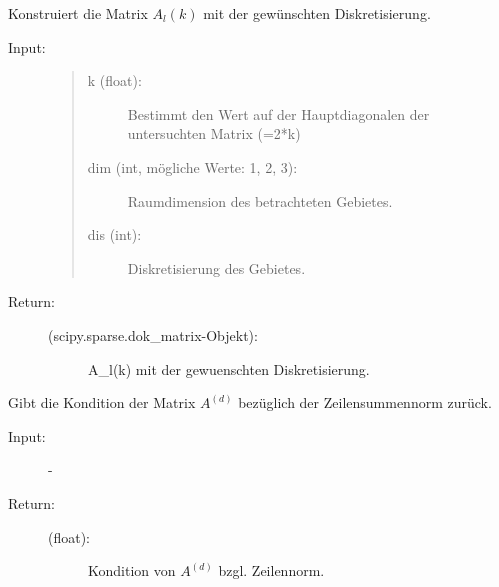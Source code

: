 \documentclass[letterpaper,10pt,ngerman, oneside, openright]{sphinxmanual}
\begin{document}
\begin{fulllineitems}
\begin{fulllineitems}
\end{fulllineitems}
\clearpage
{}

\begin{fulllineitems}
\label{\detokenize{index:sparse_erw.Sparse.constr_mat_l_k}}
Konstruiert die Matrix $A_l(k)$ mit der gewünschten Diskretisierung.

\begin{description}
\item [{Input:}] \leavevmode

\begin{quote}
\begin{description}
\item[{k (float):}] \leavevmode
Bestimmt den Wert auf der Hauptdiagonalen der untersuchten Matrix (=2*k)

\item[{dim (int, mögliche Werte: 1, 2, 3):}] \leavevmode
Raumdimension des betrachteten Gebietes.

\item[{dis (int):}] \leavevmode
Diskretisierung des Gebietes.

\end{description}
\end{quote}
\end{description}
\begin{description}
\item[{Return:}] \leavevmode\begin{description}
\item[{(scipy.sparse.dok\_matrix-Objekt):}] \leavevmode
A\_l(k) mit der gewuenschten Diskretisierung.

\end{description}

\end{description}

\end{fulllineitems}


\begin{fulllineitems}
\label{\detokenize{index:sparse_erw.Sparse.kond_a_d_zs}}
Gibt die Kondition der Matrix $A^{(d)}$ bezüglich der Zeilensummennorm zurück.

\begin{description}
\item [{Input:}] -
\end{description}
\begin{description}
\item[{Return:}] \leavevmode\begin{description}
\item[{(float):}] \leavevmode
Kondition von $A^{(d)}$ bzgl. Zeilennorm.


\end{description}
\end{description}
\end{fulllineitems}
\end{fulllineitems}
\end{document}
